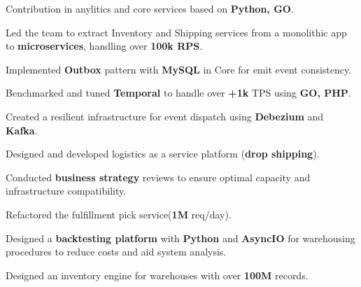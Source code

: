\documentclass[]{plushcv}
\begin{document}
\begin{minipage}[t]{0.70\textwidth}
\vspace{5pt} %
\begin{tightemize}
	\sectionsep
	\item Contribution in anylitics and core services based on \textbf{Python, GO}.
\end{tightemize}
\vspace{5pt}
\begin{tightemize}
\sectionsep
\item Led the team to extract Inventory and Shipping services from a monolithic app to \textbf{microservices}, handling over \textbf{100k RPS}.
\item Implemented \textbf{Outbox} pattern with \textbf{MySQL} in Core for emit event consistency.
\item Benchmarked and tuned \textbf{Temporal} to handle over \textbf{+1k} TPS using \textbf{GO, PHP}.
\item Created a resilient infrastructure for event dispatch using \textbf{Debezium} and \textbf{Kafka}.
\item Designed and developed logistics as a service platform (\textbf{drop shipping}).
\item Conducted \textbf{business strategy} reviews to ensure optimal capacity and infrastructure compatibility.
\end{tightemize}
\vspace{5pt} %
\begin{tightemize}
\item Refactored the fulfillment pick service(\textbf{1M} req/day).
\item Designed a \textbf{backtesting platform} with \textbf{Python} and \textbf{AsyncIO} for warehousing procedures to reduce costs and aid system analysis.
\item Designed an inventory engine for warehouses with over \textbf{100M} records.
\end{tightemize}


\end{minipage}
\end{document}
